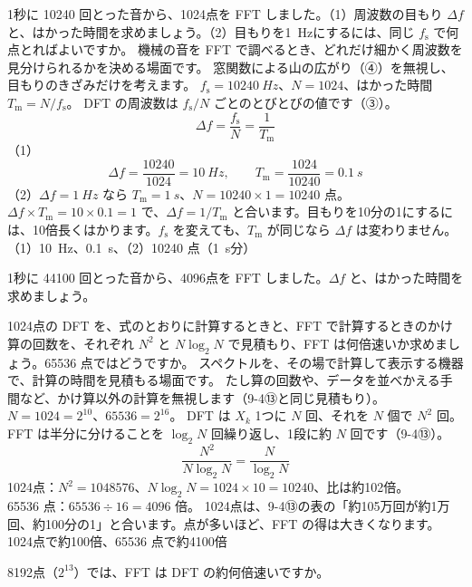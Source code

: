 \label{ph:波-11:ex5}
\begin{phreidai}
1秒に \num{10240} 回とった音から、1024点を FFT しました。（1）周波数の目もり $\Delta f$ と、はかった時間を求めましょう。（2）目もりを\qty{1}{Hz}にするには、同じ $f_{\mathrm s}$ で何点とればよいですか。
\phbamen
機械の音を FFT で調べるとき、どれだけ細かく周波数を見分けられるかを決める場面です。
\phmushi
窓関数による山の広がり（④）を無視し、目もりのきざみだけを考えます。
\phzu
$f_{\mathrm s}=\qty{10240}{Hz}$、$N=1024$、はかった時間 $T_{\mathrm m}=N/f_{\mathrm s}$。
\phriyu
DFT の周波数は $f_{\mathrm s}/N$ ごとのとびとびの値です（③）。
\phtateru
\[\Delta f=\frac{f_{\mathrm s}}{N}=\frac{1}{T_{\mathrm m}}\]
\phtoku
（1）\[\Delta f=\frac{10240}{1024}=\qty{10}{Hz},\qquad T_{\mathrm m}=\frac{1024}{10240}=\qty{0.1}{s}\]
（2）$\Delta f=\qty{1}{Hz}$ なら $T_{\mathrm m}=\qty{1}{s}$、$N=\num{10240}\times1=\num{10240}$ 点。
\phtashikame
$\Delta f\times T_{\mathrm m}=10\times0.1=1$ で、$\Delta f=1/T_{\mathrm m}$ と合います。目もりを10分の1にするには、10倍長くはかります。$f_{\mathrm s}$ を変えても、$T_{\mathrm m}$ が同じなら $\Delta f$ は変わりません。
\kotae （1）\qty{10}{Hz}、\qty{0.1}{s}、（2）\num{10240} 点（\qty{1}{s}分）
\end{phreidai}
\begin{jibun}
1秒に \num{44100} 回とった音から、4096点を FFT しました。$\Delta f$ と、はかった時間を求めましょう。
\end{jibun}

\label{ph:波-11:ex6}
\begin{phreidai}
1024点の DFT を、式のとおりに計算するときと、FFT で計算するときのかけ算の回数を、それぞれ $N^2$ と $N\log_2N$ で見積もり、FFT は何倍速いか求めましょう。\num{65536} 点ではどうですか。
\phbamen
スペクトルを、その場で計算して表示する機器で、計算の時間を見積もる場面です。
\phmushi
たし算の回数や、データを並べかえる手間など、かけ算以外の計算を無視します（9-4⑬と同じ見積もり）。
\phzu
$N=1024=2^{10}$、$\num{65536}=2^{16}$。
\phriyu
DFT は $X_k$ 1つに $N$ 回、それを $N$ 個で $N^2$ 回。FFT は半分に分けることを $\log_2N$ 回繰り返し、1段に約 $N$ 回です（9-4⑬）。
\phtateru
\[\frac{N^2}{N\log_2N}=\frac{N}{\log_2N}\]
\phtoku
1024点：$N^2=\num{1048576}$、$N\log_2N=1024\times10=\num{10240}$、比は約102倍。\\
\num{65536} 点：$\num{65536}\div16=4096$ 倍。
\phtashikame
1024点は、9-4⑬の表の「約105万回が約1万回、約100分の1」と合います。点が多いほど、FFT の得は大きくなります。
\kotae 1024点で約100倍、\num{65536} 点で約4100倍
\end{phreidai}
\begin{jibun}
8192点（$2^{13}$）では、FFT は DFT の約何倍速いですか。
\end{jibun}

